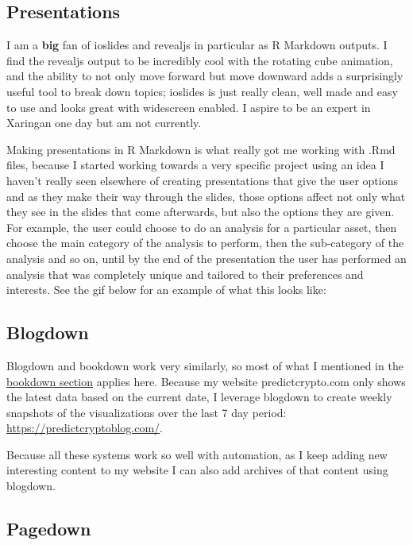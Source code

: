 \documentclass[
]{book}
\begin{document}
\hypertarget{presentations}{%
\subsection{Presentations}\label{presentations}}

I am a \textbf{big} fan of ioslides and revealjs in particular as R Markdown outputs. I find the revealjs output to be incredibly cool with the rotating cube animation, and the ability to not only move forward but move downward adds a surprisingly useful tool to break down topics; ioslides is just really clean, well made and easy to use and looks great with widescreen enabled. I aspire to be an expert in Xaringan one day but am not currently.

Making presentations in R Markdown is what really got me working with .Rmd files, because I started working towards a very specific project using an idea I haven't really seen elsewhere of creating presentations that give the user options and as they make their way through the slides, those options affect not only what they see in the slides that come afterwards, but also the options they are given. For example, the user could choose to do an analysis for a particular asset, then choose the main category of the analysis to perform, then the sub-category of the analysis and so on, until by the end of the presentation the user has performed an analysis that was completely unique and tailored to their preferences and interests. See the gif below for an example of what this looks like:

\hypertarget{blogdown}{%
\subsection{Blogdown}\label{blogdown}}

Blogdown\citep{R-blogdown} and bookdown work very similarly, so most of what I mentioned in the \protect\hyperlink{bookdown}{bookdown section} applies here. Because my website predictcrypto.com only shows the latest data based on the current date, I leverage blogdown to create weekly snapshots of the visualizations over the last 7 day period: \url{https://predictcryptoblog.com/}.

Because all these systems work so well with automation, as I keep adding new interesting content to my website I can also add archives of that content using blogdown.

\hypertarget{pagedown}{%
\subsection{Pagedown}\label{pagedown}}
\end{document}
